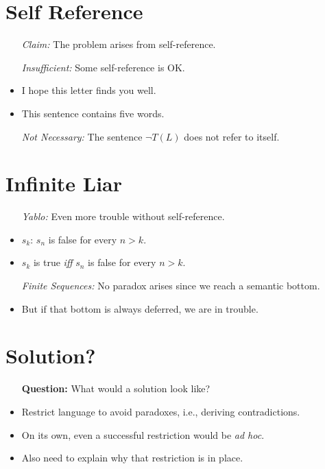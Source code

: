 \documentclass[a4paper, 11pt]{article} %
\begin{document}
\section*{Self Reference}

\begin{itemize}
  \item[\it Claim:] The problem arises from self-reference.
  \item[\it Insufficient:] Some self-reference is OK. 
    \item I hope this letter finds you well.
    \item This sentence contains five words.
  \item[\it Not Necessary:] The sentence $\neg T(L)$ does not refer to itself.
\end{itemize}






\section*{Infinite Liar}

\begin{itemize}
  \item[\it Yablo:] Even more trouble without self-reference.
    \item $s_k$: $s_n$ is false for every $n>k$. 
    \item $s_k$ is true \textit{iff} $s_n$ is false for every $n>k$. 
  \item[\it Finite Sequences:] No paradox arises since we reach a semantic bottom. 
    \item But if that bottom is always deferred, we are in trouble.
\end{itemize}





\section*{Solution?}

\begin{itemize}
  \item[\bf Question:] What would a solution look like?
    \item Restrict language to avoid paradoxes, i.e., deriving contradictions.
    \item On its own, even a successful restriction would be \textit{ad hoc}.
    \item Also need to explain why that restriction is in place.
\end{itemize}
\end{document}
